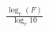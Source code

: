 \documentclass[preview]{standalone}
\begin{document}
\begin{align*}
\frac{\log_{e}(F)}{\log_{e} 10}
\end{align*}
\end{document}
